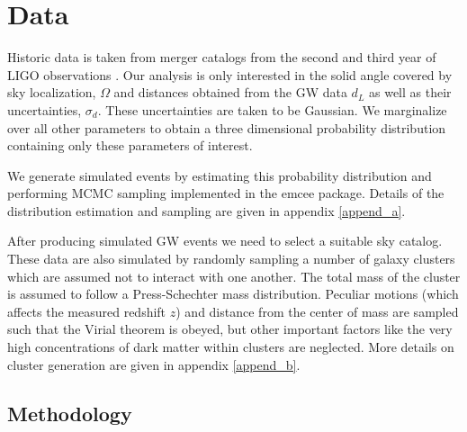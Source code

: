 \section{Data} \label{sec:develop}

Historic data is taken from merger catalogs from the second and third year of LIGO observations \cite{GWTC_2,GWTC_3}. Our analysis is only interested in the solid angle covered by sky localization, $\Omega$ and distances obtained from the GW data $d_L$ as well as their uncertainties, $\sigma_d$. These uncertainties are taken to be Gaussian. We marginalize over all other parameters to obtain a three dimensional probability distribution containing only these parameters of interest.

We generate simulated events by estimating this probability distribution and performing MCMC sampling implemented in the emcee package. Details of the distribution estimation and sampling are given in appendix \ref{append_a}.

After producing simulated GW events we need to select a suitable sky catalog. These data are also simulated by randomly sampling a number of galaxy clusters which are assumed not to interact with one another. The total mass of the cluster is assumed to follow a Press-Schechter mass distribution\cite{Press_1974}. Peculiar motions (which affects the measured redshift $z$) and distance from the center of mass are sampled such that the Virial theorem is obeyed, but other important factors like the very high concentrations of dark matter within clusters are neglected. More details on cluster generation are given in appendix \ref{append_b}.
    
\subsection{\label{Method} Methodology}


